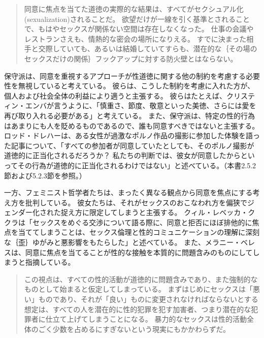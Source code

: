 \documentclass[paper=a4,book,openany]{jlreq}
\newcommand{\ig}[1]{}           %
\begin{document}
\begin{quote}
同意に焦点を当てた道徳の実際的な結果は、すべてがセクシュアル化(sexualization)されることだ。
欲望だけが一線を引く基準とされることで、もはやセックスが関係ない空間は存在しなくなった。
仕事の会議やレストランさえも、情熱的な密会の場所になりえる。
すでに決まった相手と交際していても、あるいは結婚していてすらも、潜在的な｛その場のセックスだけの関係｝{フックアップ}に対する防火壁とはならない。
\citep{french17:_its_past_time}
\end{quote}

保守派は、同意を重視するアプローチが性道徳に関する他の制約を考慮する必要性を無視していると考えている。
彼らは、こうした制約を考慮に入れた方が、個人および社会全体の利益により適うと主張する。
彼らはたとえば、クリスティン・エンバが言うように、「慎重さ、節度、敬意といった美徳、さらには愛を再び取り入れる必要がある」と考えている\citep{emba17:_lets_rethin_sex}。
また、保守派は、特定の性的行為はあまりにも人を貶めるものであるので、誰も同意すべきではないと主張する。
ロッド・ドレハー\ig{Rod Dreher}は、ある女性が過激なポルノ作品の撮影に参加した体験を語った記事について、「すべての参加者が同意していたとしても、そのポルノ撮影が道徳的に正当化されるだろうか？ 私たちの判断では、彼女が同意したからといってその行為が道徳的に正当化されるわけではない」と述べている\citep{dreher13:_porn_cultur_consen}。（本書2.5.2節および5.2.3節を参照。）

一方、フェミニスト哲学者たちは、まったく異なる観点から同意を焦点にする考え方を批判している。
彼女たちは、それがセックスのおこなわれ方を偏狭でジェンダー化された捉え方に限定してしまうと主張する。
クィル・レベッカ・ククラは「セックスをめぐる交渉について語る際に、同意と拒否にほぼ排他的に焦点を当ててしまうことは、セックス倫理と性的コミュニケーションの理解に深刻な｛歪｝{ゆが}みと悪影響をもたらした」と述べている\citep[p.75]{kukla18:_thats_what_she_said}。
また、メラニー・ベレスは、同意に焦点を当てることが性的な接触を本質的に問題含みのものにしてしまうと指摘している。

\begin{quote}
この視点は、すべての性的活動が道徳的に問題含みであり、また強制的なものとして始まると仮定してしまっている。
まずはじめにセックスは「悪い」ものであり、それが「良い」ものに変更されなければならないとする想定は、すべての人を潜在的に性的犯罪を犯す加害者、つまり潜在的な犯罪者に仕立て上げてしまうことになる。
暴力的なセックスは性的活動全体のごく少数を占めるにすぎないという現実にもかかわらずだ。
\citep[p.102]{beres07:_spont_sexual_consen}
\end{quote}
\end{document}
